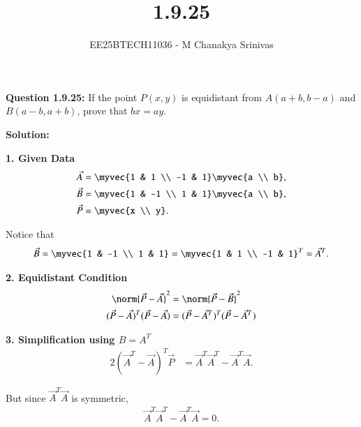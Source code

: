 \documentclass[journal]{IEEEtran}
\begin{document}

\vspace{3cm}

\title{1.9.25}
\author{EE25BTECH11036 - M Chanakya Srinivas}
\maketitle

\renewcommand{\thetable}{\theenumi}
\setlength{\intextsep}{10pt}

\renewcommand\theequation{\arabic{equation}}

\textbf{Question 1.9.25:}  
If the point $P(x,y)$ is equidistant from $A(a+b, b-a)$ and $B(a-b, a+b)$,  
prove that $bx = ay$.

\bigskip
\textbf{Solution:}

\medskip
\textbf{1. Given Data}
\begin{align}
\vec{A} &= \myvec{1 & 1 \\ -1 & 1}\myvec{a \\ b}, \\
\vec{B} &= \myvec{1 & -1 \\ 1 & 1}\myvec{a \\ b}, \\
\vec{P} &= \myvec{x \\ y}.
\end{align}

Notice that
\begin{align}
\vec{B} = \myvec{1 & -1 \\ 1 & 1} 
= \myvec{1 & 1 \\ -1 & 1}^T = \vec{A}^T.
\end{align}

\medskip
\textbf{2. Equidistant Condition}
\begin{align}
\norm{\vec{P}-\vec{A}}^2 &= \norm{\vec{P}-\vec{B}}^2 \\
(\vec{P}-\vec{A})^T(\vec{P}-\vec{A}) &= (\vec{P}-\vec{A}^T)^T(\vec{P}-\vec{A}^T)
\end{align}

\medskip
\textbf{3. Simplification using $B=A^T$}
\begin{align}
2(\vec{A}^T - \vec{A})^T \vec{P} &= \vec{A}^{T}\vec{A}^{T} - \vec{A}^T\vec{A}.
\end{align}

But since $\vec{A}^T\vec{A}$ is symmetric,  
\begin{align}
\vec{A}^{T}\vec{A}^{T} - \vec{A}^T\vec{A} = 0.
\end{align}
\end{document}
